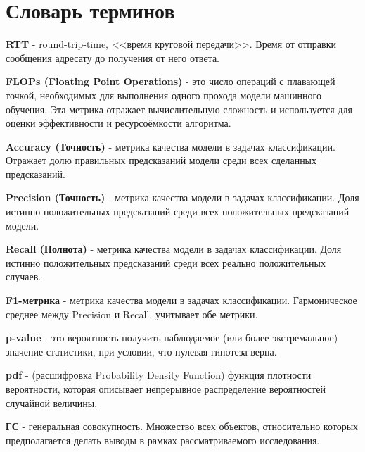 \chapter*{Словарь терминов}             %

\textbf{RTT} -  round-trip-time, <<время круговой передачи>>. Время от отправки сообщения адресату до получения от него ответа.

\textbf{FLOPs (Floating Point Operations)} - это число операций с плавающей точкой, необходимых для выполнения одного прохода модели машинного обучения. Эта метрика отражает вычислительную сложность и используется для оценки эффективности и ресурсоёмкости алгоритма.

\textbf{Accuracy (Точность)} - метрика качества модели в задачах классификации. Отражает долю правильных предсказаний модели среди всех сделанных предсказаний.

\textbf{Precision (Точность)} - метрика качества модели в задачах классификации. Доля истинно положительных предсказаний среди всех положительных
предсказаний модели.

\textbf{Recall (Полнота)}  - метрика качества модели в задачах классификации. Доля истинно положительных предсказаний среди всех реально положительных случаев.

\textbf{F1-метрика} - метрика качества модели в задачах классификации. Гармоническое среднее между Precision и Recall, учитывает обе метрики.

\textbf{p-value} - это вероятность получить наблюдаемое (или более экстремальное) значение статистики, при условии, что нулевая гипотеза верна.

\textbf{pdf} - (расшифровка Probability Density Function) функция плотности вероятности, которая описывает непрерывное распределение вероятностей случайной величины.

\textbf{ГС} - генеральная совокупность. Множество всех объектов, относительно которых предполагается делать выводы в рамках рассматриваемого исследования.
